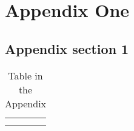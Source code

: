 \documentclass[11pt]{book}
\begin{document}
\balance



\newpage
\newcommand{\beginsupplement}{%
    \setcounter{chapter}{0}
    \renewcommand{\thechapter}{\Alph{chapter}}%
 }

\beginsupplement
\chapter{Appendix One}
\section{Appendix section 1}
\begin{table}[]
    \centering
    \begin{tabular}{c|c}
         &  \\
         & 
    \end{tabular}
    \caption{Table in the Appendix}
    \label{tab:my_label}
\end{table}
\end{document}
